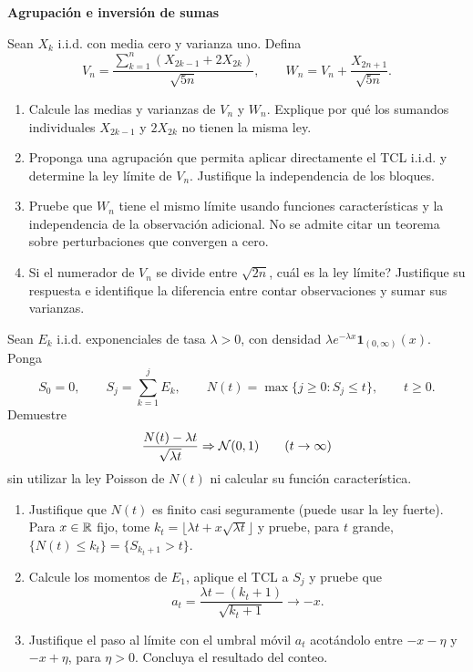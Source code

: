 \newpage
{\Large\bfseries\color{uni}Agrupación e inversión de sumas}\par
{}
Sean $X_k$ i.i.d. con media cero y varianza uno. Defina
\[
V_n=\frac{\sum_{k=1}^n(X_{2k-1}+2X_{2k})}{\sqrt{5n}},
\qquad
W_n=V_n+\frac{X_{2n+1}}{\sqrt{5n}}.
\]
\begin{enumerate}
\item Calcule las medias y varianzas de $V_n$ y $W_n$. Explique por qué los sumandos individuales $X_{2k-1}$ y $2X_{2k}$ no tienen la misma ley. 
\item Proponga una agrupación que permita aplicar directamente el TCL i.i.d. y determine la ley límite de $V_n$. Justifique la independencia de los bloques. 
\item Pruebe que $W_n$ tiene el mismo límite usando funciones características y la independencia de la observación adicional. No se admite citar un teorema sobre perturbaciones que convergen a cero. 
\item Si el numerador de $V_n$ se divide entre $\sqrt{2n}$, \textquestiondown{}cuál es la ley límite? Justifique su respuesta e identifique la diferencia entre contar observaciones y sumar sus varianzas. 
\end{enumerate}

Sean $E_k$ i.i.d. exponenciales de tasa $\lambda>0$, con densidad
$\lambda e^{-\lambda x}\mathbf1_{(0,\infty)}(x)$. Ponga
\[
S_0=0,\qquad S_j=\sum_{k=1}^jE_k,\qquad
N(t)=\max\{j\ge0:S_j\le t\},\qquad t\ge0.
\]
Demuestre
\[
\frac{N(t)-\lambda t}{\sqrt{\lambda t}}\Rightarrow\mathcal N(0,1)
\qquad(t\to\infty)
\]
sin utilizar la ley Poisson de $N(t)$ ni calcular su función característica.
\begin{enumerate}
\item Justifique que $N(t)$ es finito casi seguramente (puede usar la ley fuerte). Para $x\in\mathbb R$ fijo, tome
$k_t=\lfloor\lambda t+x\sqrt{\lambda t}\rfloor$ y pruebe, para $t$ grande,
$\{N(t)\le k_t\}=\{S_{k_t+1}>t\}$. 
\item Calcule los momentos de $E_1$, aplique el TCL a $S_j$ y pruebe que
\[
a_t=\frac{\lambda t-(k_t+1)}{\sqrt{k_t+1}}\longrightarrow-x.
\] 
\item Justifique el paso al límite con el umbral móvil $a_t$ acotándolo entre $-x-\eta$ y $-x+\eta$, para $\eta>0$. Concluya el resultado del conteo. 
\end{enumerate}

